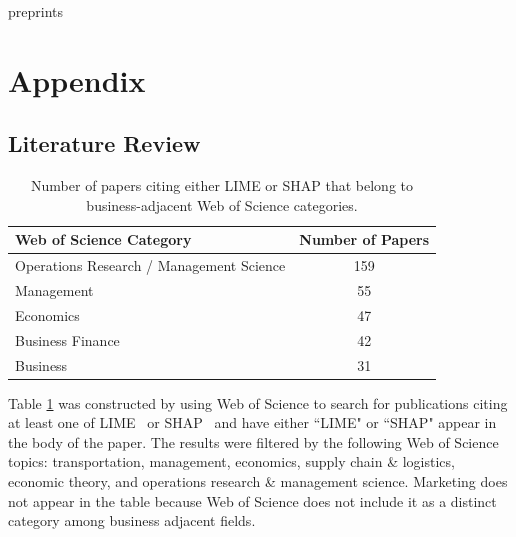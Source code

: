 \documentclass[mnsc,blindrev]{informs3}
\begin{document}
\maketitle
preprints
\section{Appendix}
    \subsection{Literature Review}
        \begin{table}[]
        \centering
        \begin{tabular}{l|c}
        \toprule
        \textbf{Web of Science Category}         & \textbf{Number of Papers} \\ \hline
        Operations Research / Management Science & 159                     \\ \hline
        Management                               & 55                      \\ \hline
        Economics                                & 47                      \\ \hline
        Business Finance                         & 42                      \\ \hline
        Business                                 & 31              \\ \bottomrule
        \end{tabular}
        \caption{Number of papers citing either LIME or SHAP that belong to business-adjacent Web of Science categories.}
        \label{tab:citation_count}
    \end{table}

        Table \ref{tab:citation_count} was constructed by using Web of Science to search for publications citing at least one of LIME~\citep{ribeiro16lime} or SHAP~\citep{lundberg17shap} and have either ``LIME" or ``SHAP" appear in the body of the paper.  The results were filtered by the following Web of Science topics: transportation, management, economics, supply chain \& logistics, economic theory, and operations research \& management science. Marketing does not appear in the table because Web of Science does not include it as a distinct category among business adjacent fields.%
 
\end{document}
